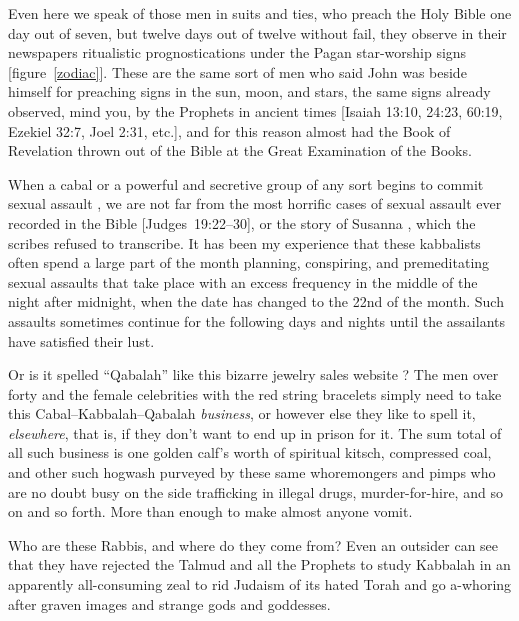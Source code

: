 \documentclass[letterpaper]{article}
\begin{document}
Even here we speak of those men in suits and ties, who preach the Holy Bible one day out of seven, but twelve days out of twelve without fail, they observe in their newspapers ritualistic prognostications under the Pagan star-worship signs [figure~\ref{zodiac}].  These are the same sort of men who said John was beside himself for preaching signs in the sun, moon, and stars, the same signs already observed, mind you, by the Prophets in ancient times [Isaiah 13:10, 24:23, 60:19, Ezekiel 32:7, Joel 2:31, etc.], and for this reason almost had the Book of Revelation thrown out of the Bible at the Great Examination of the Books.

When a cabal or a powerful and secretive group of any sort begins to commit sexual assault \cite{ceasar2015}, we are not far from the most horrific cases of sexual assault ever recorded in the Bible [Judges~19:22--30], or the story of Susanna \cite{susanna}, which the scribes refused to transcribe.  It has been my experience that these kabbalists often spend a large part of the month planning, conspiring, and premeditating sexual assaults that take place with an excess frequency in the middle of the night after midnight, when the date has changed to the 22nd of the month.  Such assaults sometimes continue for the following days and nights until the assailants have satisfied their lust.

Or is it spelled ``Qabalah'' like this bizarre jewelry sales website \cite{webq}?  The men over forty \cite{over40} and the female celebrities with the red string bracelets \cite{frost2015kabbalah} simply need to take this Cabal--Kabbalah--Qabalah \textit{business}, or however else they like to spell it, \textit{elsewhere}, that is, if they don't want to end up in prison for it.  The sum total of all such business is one golden calf's worth of spiritual kitsch, compressed coal, and other such hogwash purveyed by these same whoremongers and pimps who are no doubt busy on the side trafficking in illegal drugs, murder-for-hire, and so on and so forth.  More than enough to make almost anyone vomit.

Who are these Rabbis, and where do they come from?  Even an outsider can see that they have rejected the Talmud and all the Prophets to study Kabbalah in an apparently all-consuming zeal to rid Judaism of its hated Torah and go a-whoring after graven images and strange gods and goddesses.
\end{document}
